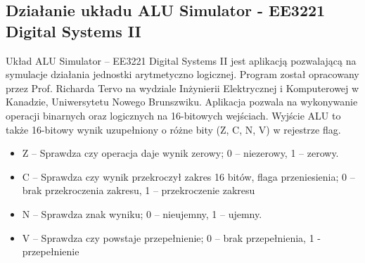\documentclass[12pt, a4paper, onside, polish]{article}				%
\begin{document}
\subsection{Działanie układu ALU Simulator - EE3221 Digital Systems II}
\hspace{\parindent}
Układ ALU Simulator – EE3221 Digital Systems II jest aplikacją pozwalającą na symulacje działania jednostki arytmetyczno logicznej. Program został opracowany przez Prof. Richarda Tervo na wydziale Inżynierii Elektrycznej i Komputerowej w Kanadzie, Uniwersytetu Nowego Brunszwiku. Aplikacja pozwala na wykonywanie operacji binarnych oraz logicznych na 16-bitowych wejściach. Wyjście ALU to także 16-bitowy wynik uzupełniony o różne bity (Z, C, N, V) w rejestrze flag.
\begin{itemize}
\item Z – Sprawdza czy operacja daje wynik zerowy; 0 – niezerowy, 1 – zerowy.
\item C – Sprawdza czy wynik przekroczył zakres 16 bitów, flaga przeniesienia; 0 – brak przekroczenia zakresu, 1 – przekroczenie zakresu
\item N – Sprawdza znak wyniku; 0 – nieujemny, 1 – ujemny.
\item V – Sprawdza czy powstaje przepełnienie; 0 – brak przepełnienia, 1 - przepełnienie \newline
\end{itemize}
\end{document}
